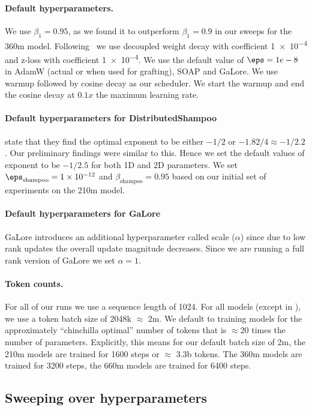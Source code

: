 \documentclass{article} %
\begin{document}
\paragraph{Default hyperparameters.} We use $\beta_1 = 0.95$, as we found it to outperform $\beta_1 = 0.9$ in our sweeps for the 360m model. Following~\citet{wortsman2024smallscale} we use decoupled weight decay with coefficient \num{1e-4} and z-loss with coefficient \num{1e-4}. We use the default value of $\eps = 1e-8$ in AdamW (actual or when used for grafting), SOAP and GaLore. We use warmup followed by cosine decay as our scheduler.  We start the warmup and end the cosine decay at $0.1x$ the maximum learning rate.


\paragraph{Default hyperparameters for DistributedShampoo} \citet{distributedshampoo} state that they find the optimal exponent to be either $-1/2$ or $-1.82/4 \approx -1/2.2$. Our preliminary findings were similar to this. Hence we set the default values of exponent to be $-1/2.5$ for both 1D and 2D parameters. We set $\eps_{\text{shampoo}} = \num{1e-12}$ and $\beta_{\text{shampoo}} = 0.95$ based on our initial set of experiments on the 210m model.

\paragraph{Default hyperparameters for GaLore} GaLore introduces an additional hyperparameter called scale ($\alpha$) since due to low rank updates the overall update magnitude decreases. Since we are running a full rank version of GaLore we set $\alpha = 1$.


\paragraph{Token counts.} For all of our runs we use a sequence length of 1024. For all models (except in ), we use a token batch size of 2048k $\approx$ 2m. We default to training models for the approximately ``chinchilla optimal'' number of tokens that is $ \approx$20 times the number of parameters. Explicitly, this means for our default batch size of 2m, the 210m models are trained for 1600 steps or $\approx$ 3.3b tokens. The 360m models are trained for 3200 steps, the 660m models are trained for 6400 steps.

\subsection{Sweeping over hyperparameters}
\end{document}
